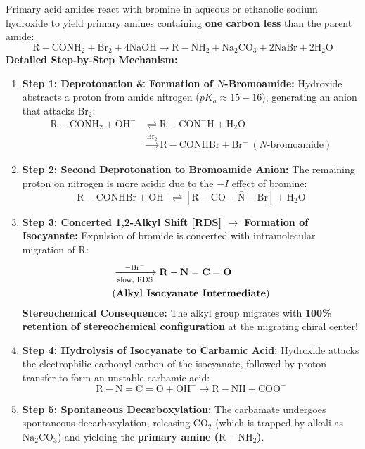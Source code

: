 \documentclass[10pt,twoside,openright]{book}
\begin{document}
\begin{conceptbox}
Primary acid amides react with bromine in aqueous or ethanolic sodium hydroxide to yield primary amines containing \textbf{one carbon less} than the parent amide:
\begin{equation}
  \mathrm{R-CONH_2} + \mathrm{Br_2} + 4\mathrm{NaOH} \to \mathrm{R-NH_2} + \mathrm{Na_2CO_3} + 2\mathrm{NaBr} + 2\mathrm{H_2O}
\end{equation}
\textbf{Detailed Step-by-Step Mechanism:}
\begin{enumerate}[leftmargin=*]
  \item \textbf{Step 1: Deprotonation \& Formation of $N$-Bromoamide:}
  Hydroxide abstracts a proton from amide nitrogen ($pK_a \approx 15-16$), generating an anion that attacks $\mathrm{Br_2}$:
  \begin{align*}
    \mathrm{R-CONH_2} + \mathrm{OH^-} &\rightleftharpoons \mathrm{R-CON^-H} + \mathrm{H_2O} \\
    &\xrightarrow{\mathrm{Br_2}} \mathrm{R-CONHBr} + \mathrm{Br^-} \ (N\text{-bromoamide})
  \end{align*}
  \item \textbf{Step 2: Second Deprotonation to Bromoamide Anion:}
  The remaining proton on nitrogen is more acidic due to the $-I$ effect of bromine:
  \begin{equation*}
    \mathrm{R-CONHBr} + \mathrm{OH^-} \rightleftharpoons [\mathrm{R-CO-\bar{N}-Br}] + \mathrm{H_2O}
  \end{equation*}
  \item \textbf{Step 3: Concerted 1,2-Alkyl Shift [RDS] $\to$ Formation of Isocyanate:}
  Expulsion of bromide is concerted with intramolecular migration of $\mathrm{R}$:
  \begin{align*}
    [\mathrm{R-CO-\bar{N}-Br}] &\xrightarrow[\text{slow, RDS}]{-\mathrm{Br^-}} \mathbf{R-N=C=O} \\
    &(\text{\textbf{Alkyl Isocyanate Intermediate}})
  \end{align*}
  \textbf{Stereochemical Consequence:} The alkyl group migrates with \textbf{100\% retention of stereochemical configuration} at the migrating chiral center!
  \item \textbf{Step 4: Hydrolysis of Isocyanate to Carbamic Acid:}
  Hydroxide attacks the electrophilic carbonyl carbon of the isocyanate, followed by proton transfer to form an unstable carbamic acid:
  \begin{equation}
    \mathrm{R-N=C=O} + \mathrm{OH^-} \to \mathrm{R-NH-COO^-}
  \end{equation}
  \item \textbf{Step 5: Spontaneous Decarboxylation:}
  The carbamate undergoes spontaneous decarboxylation, releasing $\mathrm{CO_2}$ (which is trapped by alkali as $\mathrm{Na_2CO_3}$) and yielding the \textbf{primary amine ($\mathrm{R-NH_2}$)}.
\end{enumerate}
\end{conceptbox}
\end{document}
